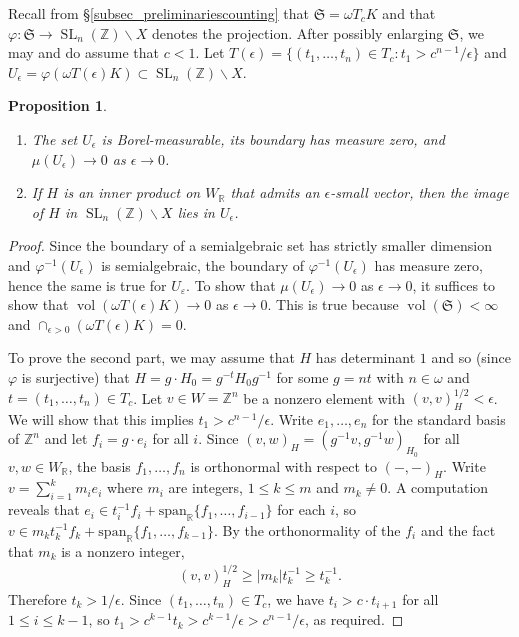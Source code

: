 \documentclass{article} %
\newtheorem{proposition}{Proposition}[section]
\numberwithin{equation}{section}
\DeclareMathOperator{\SL}{SL}
\DeclareMathOperator{\vol}{vol}
\newcommand{\R}{\mathbb{R}}
\newcommand{\Z}{\mathbb{Z}}
\newcommand{\Siegel}{\mathfrak{S}}
\begin{document}
Recall from \S\ref{subsec_preliminariescounting} that $\Siegel  = \omega T_c K$ and that $\varphi\colon \Siegel \rightarrow \SL_n(\Z)\backslash X$ denotes the projection.
After possibly enlarging $\Siegel$, we may and do assume that $c<1$.
Let $T(\epsilon) = \{(t_1,\dots,t_n) \in T_c \colon t_1 > c^{n-1}/\epsilon\}$ and $U_{\epsilon} = \varphi(\omega T(\epsilon) K)\subset \SL_n(\Z)\backslash X$.

\begin{proposition}\label{prop_good_neighbourhoods_of_cusp}
    \begin{enumerate}
        \item The set $U_{\epsilon}$ is Borel-measurable, its boundary has measure zero, and $\mu(U_{\epsilon})\rightarrow 0$ as $\epsilon \rightarrow 0$.
        \item If $H$ is an inner product on $W_{\R}$ that admits an $\epsilon$-small vector, then the image of $H$ in $\SL_n(\Z)\backslash X$ lies in $U_{\epsilon}$.
    \end{enumerate}
\end{proposition}
\begin{proof}
    Since the boundary of a semialgebraic set has strictly smaller dimension \cite[Proposition 2.8.13]{BCR-realalgebraicgeometry} and $\varphi^{-1}(U_{\epsilon})$ is semialgebraic, the boundary of $\varphi^{-1}(U_{\epsilon})$ has measure zero, hence the same is true for $U_{\varepsilon}$. To show that $\mu(U_{\epsilon})\rightarrow 0$ as $\epsilon\rightarrow 0$, it suffices to show that $\vol(\omega T(\epsilon) K) \rightarrow 0$ as $\epsilon \rightarrow 0$. This is true because $\vol(\Siegel)<\infty$ and $\cap_{\epsilon >0} (\omega T(\epsilon) K) =0$.

    To prove the second part, we may assume that $H$ has determinant $1$ and so (since $\varphi$ is surjective) that $H = g\cdot H_0 = g^{-t} H_0 g^{-1}$ for some $g =nt$ with $n\in \omega$ and $t = (t_1,\dots, t_n)\in T_c$. 
    Let $v\in W=\Z^n$ be a nonzero element with $(v,v)_H^{1/2} < \epsilon$.
    We will show that this implies $t_1> c^{n-1}/\epsilon$.
    Write $e_1,\dots,e_n$ for the standard basis of $\Z^n$ and let $f_i = g \cdot e_i$ for all $i$. 
    Since $(v,w)_{H} = (g^{-1}v,g^{-1}w)_{H_0}$ for all $v,w\in W_{\R}$, the basis $f_1,\dots,f_n$ is orthonormal with respect to $(-,-)_H$.
    Write $v = \sum_{i=1}^k m_i e_i$ where $m_i$ are integers, $1\leq k\leq m$ and $m_k\neq 0$.
    A computation reveals that $e_i \in t_i^{-1} f_i + \text{span}_{\R}\{f_1,\dots,f_{i-1}\}$ for each $i$, so $v \in m_k t_k^{-1} f_k + \text{span}_{\R}\{f_1,\dots,f_{k-1}\}$.
    By the orthonormality of the $f_i$ and the fact that $m_k$ is a nonzero integer,
    \begin{align*}
        (v,v)^{1/2}_H\geq |m_k|t_k^{-1}\geq t_k^{-1}.
    \end{align*}
    Therefore $t_k > 1/\epsilon$.
    Since $(t_1,\dots,t_n) \in T_c$, we have $t_i > c\cdot  t_{i+1}$ for all $1\leq i \leq k-1$, so $t_1 > c^{k-1} t_k > c^{k-1}/ \epsilon > c^{n-1}/\epsilon$, as required.
\end{proof}
\end{document}
